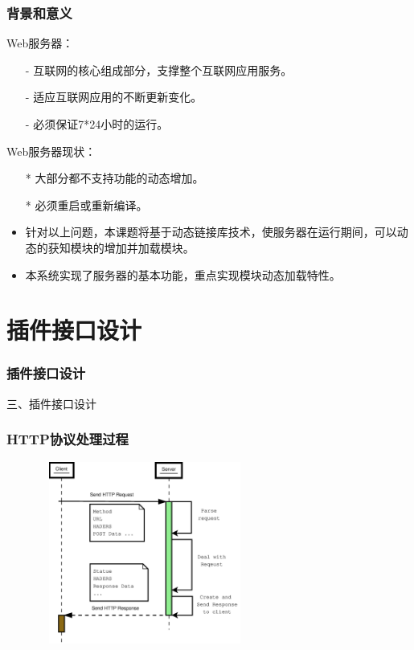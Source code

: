 \documentclass[10pt,dvipdfm]{beamer}
\begin{document}
\begin{frame}
	\frametitle{背景和意义}
	\begin{block}{Web服务器：}
		\begin{itemize}
			\item[-] 互联网的核心组成部分，支撑整个互联网应用服务。
			\item[-] 适应互联网应用的不断更新变化。
			\item[-] 必须保证7*24小时的运行。
		\end{itemize}
	\end{block}
	
	\pause
	
	\begin{block}{Web服务器现状：}
		\begin{itemize}
			\item[*] 大部分都不支持功能的动态增加。
			\item[*] 必须重启或重新编译。
		\end{itemize}
	\end{block}
	\pause
	\begin{block}{}
	\begin{itemize}
		\item 针对以上问题，本课题将基于动态链接库技术，使服务器在运行期间，可以动态的获知模块的增加并加载模块。
		\item 本系统实现了服务器的基本功能，重点实现模块动态加载特性。
	\end{itemize}
	\end{block}
\end{frame}

\section{插件接口设计}



\begin{frame}
	\frametitle{插件接口设计}
	\begin{center}
	{\Large
		三、插件接口设计
	}
	\end{center}
\end{frame}


\begin{frame}
	\frametitle{HTTP协议处理过程}
	\begin{figure}[htbp]
	\centering
	\includegraphics[height=6cm, width=7cm]{pics/serverhttp.eps}
	\end{figure}
\end{frame}
\end{document}
